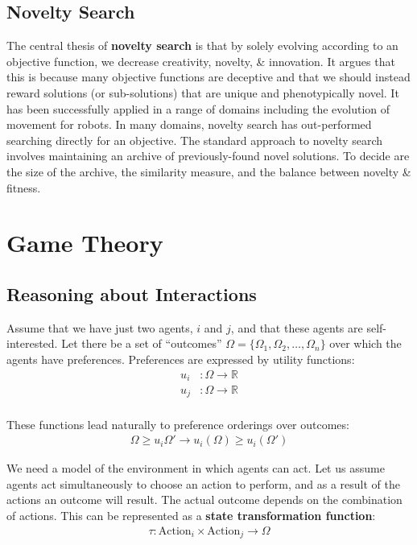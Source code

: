 \documentclass[a4paper,11pt]{article}
\begin{document}
\subsection{Novelty Search}
The central thesis of \textbf{novelty search} is that by solely evolving according to an objective function, we decrease creativity, novelty, \& innovation.
It argues that this is because many objective functions are deceptive and that we should instead reward solutions (or sub-solutions) that are unique and phenotypically novel.
It has been successfully applied in a range of domains including the evolution of movement for robots.
In many domains, novelty search has out-performed searching directly for an objective.
The standard approach to novelty search involves maintaining an archive of previously-found novel solutions.
To decide are the size of the archive, the similarity measure, and the balance between novelty \& fitness.

\section{Game Theory}
\subsection{Reasoning about Interactions}
Assume that we have just two agents, $i$ and $j$, and that these agents are self-interested.
Let there be a set of ``outcomes'' $\Omega = \{ \Omega_1, \Omega_2, \dots, \Omega_n \}$ over which the agents have preferences.
Preferences are expressed by utility functions:
\begin{align*}
    u_i& : \Omega \rightarrow \mathbb{R} \\
    u_j& : \Omega \rightarrow \mathbb{R} \\
\end{align*}

These functions lead naturally to preference orderings over outcomes:
\begin{align*}
    \Omega \geq u_i \Omega' \rightarrow u_i(\Omega) \geq u_i(\Omega')
\end{align*}

We need a model of the environment in which agents can act.
Let us assume agents act simultaneously to choose an action to perform, and as a result of the actions an outcome will result.
The actual outcome depends on the combination of actions.
This can be represented as a \textbf{state transformation function}:
\begin{align*}
    \tau: \text{Action}_i \times \text{Action}_j \rightarrow \Omega
\end{align*}
\end{document}
